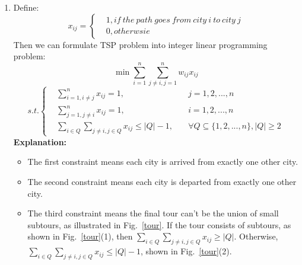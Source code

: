 \documentclass[12pt,a4paper]{article}
\makeatletter
\newtheorem*{solution}{Solution}
\theoremstyle{definition}
\renewenvironment{solution}[1][Solution] {\par\pushQED{\qed}\normalfont\topsep6\p@\@plus6\p@\relax\trivlist\item[\hskip\labelsep\bfseries#1\@addpunct{.}]\ignorespaces}{\popQED\endtrivlist\@endpefalse} \makeatother
\makeatother
\begin{document}
\begin{enumerate}
\begin{solution}
    
    Define:
    $$ 
			x_{ij}=\left\{
            \begin{aligned}
            & 1, if\ the\ path\ goes\ from\ city\ i\ to\ city\ j \\
            & 0, otherwsie
            \end{aligned}
            \right.
            $$
    Then we can formulate TSP problem into integer linear programming problem:
    $$
    \displaystyle \min \sum_{i=1}^n\sum_{j\neq i,j=1}^n w_{ij}x_{ij}
    $$
    $$
    s.t.\left\{
    \begin{aligned}
    & \sum_{i=1,i\neq j}^n x_{ij} = 1, &j=1,2,...,n\\
    & \sum_{j=1,j\neq i}^n x_{ij} = 1,  &i=1,2,...,n\\
    & \sum_{i\in Q}\sum_{j\neq i,j\in Q}x_{ij}\leq |Q|-1,  \quad &\forall Q \subseteq \{1,2,...,n\},|Q|\geq 2 
    \end{aligned}
    \right.
    $$
    \textbf{Explanation:}
    \begin{itemize}
        \item The first constraint means each city is arrived from exactly one other city.
        \item The second constraint means each city is departed from exactly one other city.
        \item The third constraint means the final tour can't be the union of small subtours, as illustrated in Fig.~\ref{tour}. If the tour consists of subtours, as shown in Fig.~\ref{tour}(1), then $\sum_{i\in Q}\sum_{j\neq i,j\in Q}x_{ij}\geq |Q|$. Otherwise, $\sum_{i\in Q}\sum_{j\neq i,j\in Q}x_{ij}\leq |Q|-1$, shown in Fig.~\ref{tour}(2).
        

\end{itemize}
\end{solution}
\end{enumerate}
\end{document}
